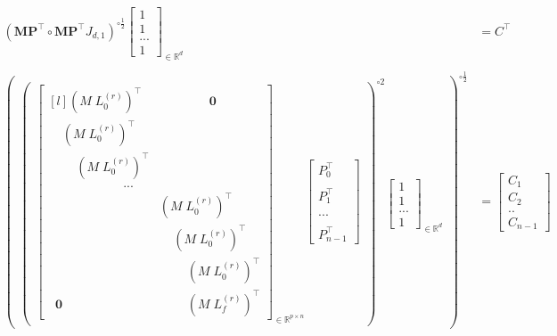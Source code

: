 \documentclass{article}
\begin{document}
\begin{equation} \label{Derivative Magnitude Constraint}
\begin{aligned}
( \textbf{M} \textbf{P}^{\intercal} \circ \textbf{M} \textbf{P}^{\intercal} J_{d,1})^{\circ \frac{1}{2}} \begin{bmatrix}
1 \\ 1 \\ ... \\ 1
\end{bmatrix}_{\in \mathbb{R}^{d}} & = C^{\intercal} \\ \\
    \begin{pmatrix} \begin{pmatrix} \begin{bmatrix*}[l] (M \; L_0^{(r)})^{\intercal} & \qquad \qquad \textbf{0} \\
    \;\; \;\; (M \; L_0^{(r)})^{\intercal} & \\
    \;\; \;\; \;\; \;\; (M \; L_0^{(r)})^{\intercal} & \\
    \qquad \qquad \qquad ... & \\
     & (M \; L_0^{(r)})^{\intercal} \;\; \;\; \;\; \;\; \\
     & \;\;\;\; (M \; L_0^{(r)})^{\intercal} \;\; \;\; \\
     & \;\;\;\;\;\;\;\; (M \; L_0^{(r)})^{\intercal} \\
    \;\; \textbf{0} & \;\;\;\;\;\;\;\; (M \; L_f^{(r)})^{\intercal}
    \end{bmatrix*}_{\in \mathbb{R}^{p \times n}}
    \begin{bmatrix}
        P_0^{\intercal} \\\\ P_1^\intercal \\\\ ... \\\\ P_{n-1}^\intercal
    \end{bmatrix}\end{pmatrix}^{\circ 2} \begin{bmatrix} 1 \\ 1 \\ ... \\ 1 \end{bmatrix}_{\in \mathbb{R}^{d}} \end{pmatrix}^{\circ \frac{1}{2}} & = \begin{bmatrix}
    C_1 \\ C_2 \\ .. \\ C_{n-1}
    \end{bmatrix}
\end{aligned}
\end{equation}
\end{document}
